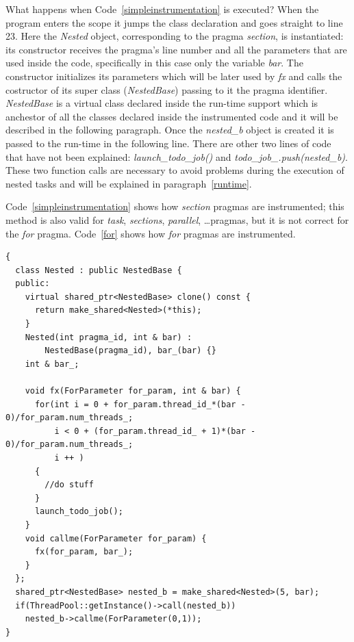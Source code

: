 \documentclass[a4paper,11pt,oneside]{book}
\begin{document}
What happens when Code~\ref{simpleinstrumentation} is executed? When the program enters the scope it jumps the class declaration and goes straight to line 23. Here the \emph{Nested} object, corresponding to the pragma \emph{section}, is instantiated: its constructor receives the pragma’s line number and all the parameters that are used inside the code, specifically in this case only the variable \emph{bar}. The constructor initializes its parameters which will be later used by \emph{fx} and calls the costructor of its super class (\emph{NestedBase}) passing to it the pragma identifier.  \emph{NestedBase} is a virtual class declared inside the run-time support which is anchestor of all the classes declared inside the instrumented code and it will be described in the following paragraph. Once the \emph{nested\_b} object is created it is passed to the run-time in the following line. There are other two lines of code that have not been explained: \emph{launch\_todo\_job()} and \emph{todo\_job\_.push(nested\_b)}. These two function calls are necessary to avoid problems during the execution of nested tasks and will be explained in paragraph~\ref{runtime}.

Code~\ref{simpleinstrumentation} shows how \emph{section} pragmas are instrumented; this method is also valid for \emph{task}, \emph{sections}, \emph{parallel}, \dots pragmas, but it is not correct for the \emph{for} pragma. Code~\ref{for} shows how \emph{for} pragmas are instrumented.

\begin{lstlisting}[language=CCC, caption=Example of an instrumented \emph{for} pragma from Code~\ref{code}., label=for]
{
  class Nested : public NestedBase {
  public: 
    virtual shared_ptr<NestedBase> clone() const { 
      return make_shared<Nested>(*this);
    } 
    Nested(int pragma_id, int & bar) : 
        NestedBase(pragma_id), bar_(bar) {}
    int & bar_;

    void fx(ForParameter for_param, int & bar) {
      for(int i = 0 + for_param.thread_id_*(bar - 0)/for_param.num_threads_; 
          i < 0 + (for_param.thread_id_ + 1)*(bar - 0)/for_param.num_threads_; 
          i ++ )
      {
        //do stuff
      }  
      launch_todo_job(); 
    }
    void callme(ForParameter for_param) {
      fx(for_param, bar_);
    }
  };
  shared_ptr<NestedBase> nested_b = make_shared<Nested>(5, bar);
  if(ThreadPool::getInstance()->call(nested_b)) 
    nested_b->callme(ForParameter(0,1));
}
\end{lstlisting}
\end{document}
